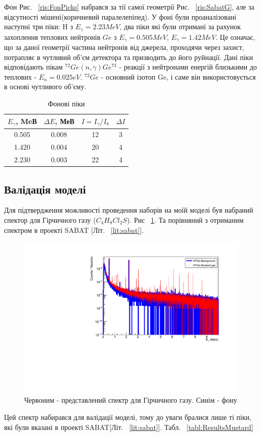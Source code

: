 \documentclass[a4paper, 14pt]{article}
\numberwithin{equation}{section}
\numberwithin{table}{section}
\begin{document}
Фон Рис. ~\ref{ris:FonPicks} набрався за тії самої геометрії Рис. ~\ref{ris:SabatG}, але за відсутності мішені(коричневий паралелепіпед). У фоні були проаналізовані наступні три піки: H з $E_\gamma = 2.23 MeV$, два піки які були отримані за рахунок захоплення теплових нейтронів $Ge$ з $E_\gamma = 0.505MeV$, $E_\gamma = 1.42 MeV$. Це означає, що за даної геометрії частина нейтронів від джерела, проходячи через захист, потрапляє в чутливий об'єм детектора та призводить до його руйнації. Дані піки відповідають пікам $^{72}Ge(n, \gamma)Ge^{73}$ - реакції з нейтронами енергій близькими до теплових - $E_n = 0.025eV$. $^{72}Ge$ - основний ізотоп Ge, і саме він використовується в основі чутливого об'єму.
\begin{table}[h]
	\centering
	\caption{Фонові піки} 
	\begin{tabular}{|c|c|c|c|} 
		\hline
		$E_{\gamma}$, MeВ & $\Delta{E}$, МеВ & $I = I_{\gamma} / I_{b}$ & $\Delta{I}$\\
		\hline
		0.505 & 0.008 & 12 & 3 \\
		\hline
		1.420 & 0.004 & 20 & 4 \\	
		\hline
		2.230 & 0.003 & 22 & 4 \\	
		\hline
	\end{tabular}
	\label{tabl:ResultsBackground}
\end{table}

\subsection{Валідація моделі}

Для підтвердження можливості проведення наборів на моїй моделі був набраний спектор для Гірчичного газу ($C_4H_8Cl_2S$). Рис ~\ref{ris:MustBackAllLogSm}. Та порівняний з отриманим спектром в проекті SABAT [Літ. ~\ref{lit:sabat}].
\begin{figure}[hbt!]
	\centering \includegraphics[width=1\textwidth]{res/smMustFonAll.pdf}
	\caption{Червоним - представлений спектр для Гірчичного газу. Синім - фону} 
	\label{ris:MustBackAllLogSm}	
\end{figure} 
Цей спектр набирався для валідації моделі, тому до уваги бралися лише ті піки, які були вказані в проекті SABAT[Літ. ~\ref{lit:sabat}]. Табл. ~\ref{tabl:ResultsMustard}
\end{document}
